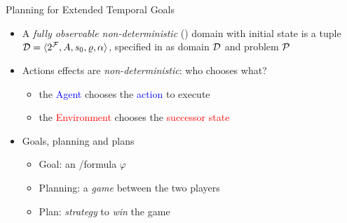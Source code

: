 \documentclass[10pt]{beamer}
\begin{document}
\section{\FONDFOR}

\begin{frame}{\FOND Planning for Extended Temporal Goals}
\begin{itemize}
\item A \textit{fully observable non-deterministic} (\FOND) domain with initial state is a tuple $\D = \tup{2^\F, A, s_0, \varrho, \alpha}$, specified in \PDDL as domain $\D$ and problem $\P$

\item Actions effects are \emph{non-deterministic}: who chooses what?
\begin{itemize}
\item the \textcolor{blue}{Agent} chooses the \textcolor{blue}{action} to execute
\item the \textcolor{red}{Environment} chooses the \textcolor{red}{successor state}
\end{itemize}

\item Goals, planning and plans
\begin{itemize}
\item Goal: an \LTLf/\PLTL formula $\varphi$
\item Planning: a \emph{game} between the two players
\item Plan: \emph{strategy} to \emph{win} the game
\end{itemize}
\end{itemize}

\end{frame}
\end{document}
